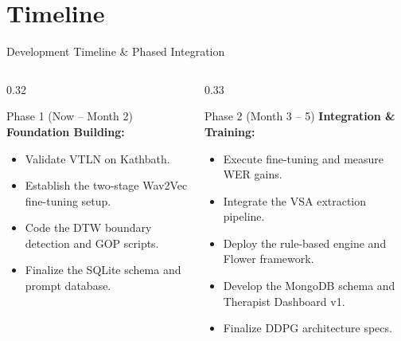 \documentclass[aspectratio=169, 11pt, xcolor=table]{beamer}
\begin{document}
\section{Timeline}
\begin{frame}{Development Timeline \& Phased Integration}
    \vspace{-2mm}
    \begin{columns}[T]
        \begin{column}{0.32\textwidth}
            \begin{block}{\scriptsize Phase 1 (Now -- Month 2)}
                \scriptsize
                \textbf{Foundation Building:}
                \begin{itemize}
                    \item Validate VTLN on Kathbath.
                    \item Establish the two-stage Wav2Vec fine-tuning setup.
                    \item Code the DTW boundary detection and GOP scripts.
                    \item Finalize the SQLite schema and prompt database.
                \end{itemize}
            \end{block}
        \end{column}

        \begin{column}{0.33\textwidth}
            \begin{block}{\scriptsize Phase 2 (Month 3 -- 5)}
                \scriptsize
                \textbf{Integration \& Training:}
                \begin{itemize}
                    \item Execute fine-tuning and measure WER gains.
                    \item Integrate the VSA extraction pipeline.
                    \item Deploy the rule-based engine and Flower framework.
                    \item Develop the MongoDB schema and Therapist Dashboard v1.
                    \item Finalize DDPG architecture specs.
                \end{itemize}
            \end{block}
        \end{column}


\end{columns}
\end{frame}
\end{document}
